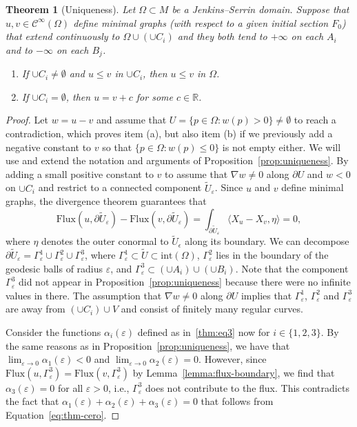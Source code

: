 \documentclass[a4paper,10pt,reqno]{amsart}
\newcommand{\R}{\mathbb{R}}
\newcommand{\Flux}{\mathrm{Flux}}
\newtheorem{theorem}{Theorem}[section]
\theoremstyle{definition}
\theoremstyle{remark}
\numberwithin{equation}{section}
\begin{document}
\begin{theorem}[Uniqueness]\label{thm:infinity}
Let $\Omega\subset M$ be a Jenkins--Serrin domain. Suppose that $u,v\in\mathcal{C}^\infty(\Omega)$ define minimal graphs (with respect to a given initial section $F_0$) that extend continuously to $\Omega\cup(\cup C_i)$ and they both tend to $+\infty$ on each $A_i$ and to $-\infty$ on each $B_j$. 
\begin{enumerate}[label=(\alph*)]
	\item If $\cup C_i\neq\emptyset$ and $u\leq v$ in $\cup C_i$, then $u\leq v$ in $\Omega$. 
	\item If $\cup C_i=\emptyset$, then $u=v+c$ for some $c\in\R$.
\end{enumerate}
\end{theorem}
	
\begin{proof}
Let $w=u-v$ and assume that $U=\{p\in\Omega:w(p)>0\}\neq\emptyset$ to reach a contradiction, which proves item (a), but also item (b) if we previously add a negative constant to $v$ so that $\{p\in\Omega:w(p)\leq 0\}$ is not empty either. We will use and extend the notation and arguments of Proposition~\ref{prop:uniqueness}. By adding a small positive constant to $v$ to assume that $\nabla w\neq 0$ along $\partial U$ and $w<0$ on $\cup C_i$ and restrict to a connected component $\widetilde U_\varepsilon$. Since $u$ and $v$ define minimal graphs, the divergence theorem guarantees that
\begin{equation}\label{eq:thm-cero}
	\Flux(u,\partial \widetilde U_\varepsilon)-\Flux(v,\partial \widetilde U_\varepsilon)=\int_{\partial \widetilde U_\varepsilon}\langle X_u-X_v,\eta\rangle=0,
\end{equation}
where $\eta$ denotes the outer conormal to $\widetilde U_\epsilon$ along its boundary. We can decompose $\partial\widetilde U_\varepsilon=\Gamma^1_\varepsilon\cup \Gamma^2_\varepsilon\cup\Gamma^3_\varepsilon$, where $\Gamma^1_\varepsilon\subset\widetilde U\subset\mathrm{int}(\Omega)$, $\Gamma^2_\varepsilon$ lies in the boundary of the geodesic balls of radius $\varepsilon$, and $\Gamma^3_\varepsilon\subset(\cup A_i)\cup(\cup B_i)$. Note that the component $\Gamma^3_\varepsilon$ did not appear in Proposition~\ref{prop:uniqueness} because there were no infinite values in there. The assumption that $\nabla w\neq 0$ along $\partial U$ implies that $\Gamma^1_\varepsilon$, $\Gamma^2_\varepsilon$ and $\Gamma^3_\varepsilon$ are away from $(\cup C_i)\cup V$ and consist of finitely many regular curves.

Consider the functions $\alpha_i(\varepsilon)$ defined as in~\eqref{thm:eq3} now for $i\in\{1,2,3\}$. By the same reasons as in Proposition~\ref{prop:uniqueness}, we have that $\lim_{\varepsilon\to 0}\alpha_1(\varepsilon)<0$ and $\lim_{\varepsilon\to 0}\alpha_2(\varepsilon)=0$. However, since $\Flux(u,\Gamma_\varepsilon^3)=\Flux(v,\Gamma_\varepsilon^3)$ by Lemma~\ref{lemma:flux-boundary}, we find that $\alpha_3(\varepsilon)=0$ for all $\varepsilon>0$, i.e., $\Gamma_\varepsilon^3$ does not contribute to the flux. This contradicts the fact that $\alpha_1(\varepsilon)+\alpha_2(\varepsilon)+\alpha_3(\varepsilon)=0$ that follows from Equation~\eqref{eq:thm-cero}.
\end{proof}
\end{document}
